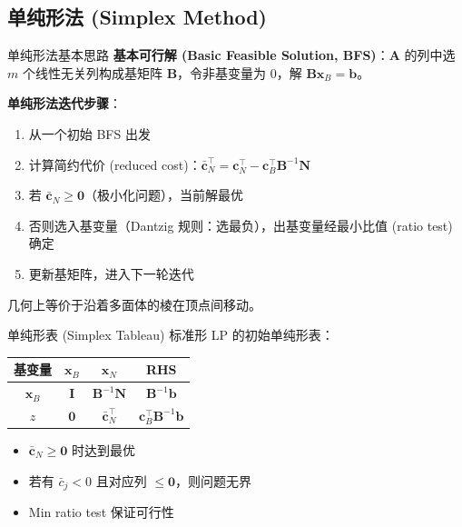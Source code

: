\documentclass[11pt, aspectratio=169, svgnames, table, fontset=fandol]{ctexbeamer}
\begin{document}
\subsection{单纯形法 (Simplex Method)}

\begin{frame}{单纯形法基本思路}
  \textbf{基本可行解 (Basic Feasible Solution, BFS)}：$\bm{A}$ 的列中选 $m$ 个线性无关列构成基矩阵 $\bm{B}$，令非基变量为 0，解 $\bm{Bx}_B = \bm{b}$。

  \vspace{8pt}
  \textbf{单纯形法迭代步骤}：
  \begin{enumerate}
    \item 从一个初始 BFS 出发
    \item 计算简约代价 (reduced cost)：$\bar{\bm{c}}_N^\top = \bm{c}_N^\top - \bm{c}_B^\top \bm{B}^{-1}\bm{N}$
    \item 若 $\bar{\bm{c}}_N \geq \bm{0}$（极小化问题），当前解最优
    \item 否则选入基变量（Dantzig 规则：选最负），出基变量经最小比值 (ratio test) 确定
    \item 更新基矩阵，进入下一轮迭代
  \end{enumerate}
  几何上等价于沿着多面体的棱在顶点间移动。
\end{frame}

\begin{frame}{单纯形表 (Simplex Tableau)}
  标准形 LP 的初始单纯形表：
  \begin{center}
    \begin{tabular}{c|cc|c}
      \toprule
      基变量 & $\bm{x}_B$ & $\bm{x}_N$ & RHS \\
      \midrule
      $\bm{x}_B$ & $\bm{I}$ & $\bm{B}^{-1}\bm{N}$ & $\bm{B}^{-1}\bm{b}$ \\
      \midrule
      $z$ & $\bm{0}$ & $\bar{\bm{c}}_N^\top$ & $\bm{c}_B^\top \bm{B}^{-1}\bm{b}$ \\
      \bottomrule
    \end{tabular}
  \end{center}
  \begin{itemize}
    \item $\bar{\bm{c}}_N \geq \bm{0}$ 时达到最优
    \item 若有 $\bar{c}_j < 0$ 且对应列 $\leq \bm{0}$，则问题无界
    \item Min ratio test 保证可行性
  \end{itemize}
\end{frame}
\end{document}
